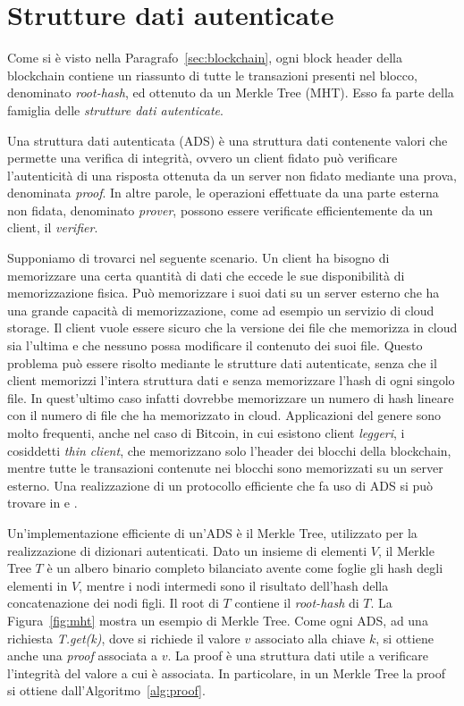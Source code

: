 \section{Strutture dati autenticate}\label{sec:ads}

Come si è visto nella Paragrafo~\ref{sec:blockchain}, ogni block header della blockchain contiene un riassunto di tutte le transazioni presenti nel blocco, denominato \emph{root-hash}, ed ottenuto da un Merkle Tree (MHT). Esso fa parte della famiglia delle \emph{strutture dati autenticate}.

Una struttura dati autenticata (ADS) è una struttura dati contenente valori che permette una verifica di integrità, ovvero un client fidato può verificare l'autenticità di una risposta ottenuta da un server non fidato mediante una prova, denominata \emph{proof}. In altre parole, le operazioni effettuate da una parte esterna non fidata, denominato \emph{prover}, possono essere verificate efficientemente da un client, il \emph{verifier}.

Supponiamo di trovarci nel seguente scenario. Un client ha bisogno di memorizzare una certa quantità di dati che eccede le sue disponibilità di memorizzazione fisica. Può memorizzare i suoi dati su un server esterno che ha una grande capacità di memorizzazione, come ad esempio un servizio di cloud storage. Il client vuole essere sicuro che la versione dei file che memorizza in cloud sia l'ultima e che nessuno possa modificare il contenuto dei suoi file. Questo problema può essere risolto mediante le strutture dati autenticate, senza che il client memorizzi l'intera struttura dati e senza memorizzare l'hash di ogni singolo file. In quest'ultimo caso infatti dovrebbe memorizzare un numero di hash lineare con il numero di file che ha memorizzato in cloud. Applicazioni del genere sono molto frequenti, anche nel caso di Bitcoin, in cui esistono client \emph{leggeri}, i cosiddetti \emph{thin client}, che memorizzano solo l'header dei blocchi della blockchain, mentre tutte le transazioni contenute nei blocchi sono memorizzati su un server esterno. Una realizzazione di un protocollo efficiente che fa uso di ADS si può trovare in \cite{pennino2019pipeline} e \cite{gdm}.

Un'implementazione efficiente di un'ADS è il Merkle Tree, utilizzato per la realizzazione di dizionari autenticati. Dato un insieme di elementi $V$, il Merkle Tree $T$ è un albero binario completo bilanciato avente come foglie gli hash degli elementi in $V$, mentre i nodi intermedi sono il risultato dell'hash della concatenazione dei nodi figli. Il root di $T$ contiene il \emph{root-hash} di $T$. La Figura~\ref{fig:mht} mostra un esempio di Merkle Tree.
Come ogni ADS, ad una richiesta \emph{T.get(k)}, dove si richiede il valore $v$ associato alla chiave $k$, si ottiene anche una \emph{proof} associata a $v$. La proof è una struttura dati utile a verificare l'integrità del valore a cui è associata. In particolare, in un Merkle Tree la proof si ottiene dall'Algoritmo~\ref{alg:proof}.

